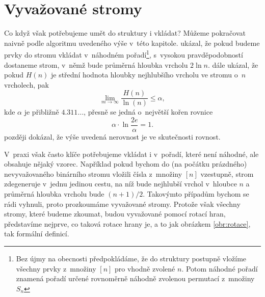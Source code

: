 \section{Vyvažované stromy}

Co když však potřebujeme umět do struktury i vkládat? Můžeme pokračovat naivně
podle algoritmu uvedeného výše v~této kapitole. \citet{sortingsearching}
ukázal, že pokud budeme prvky do stromu vkládat v~náhodném pořadí\footnote{Bez
újmy na obecnosti předpokládáme, že do struktury postupně vložíme všechny prvky
z~množiny $[n]$ pro vhodně zvolené $n$. Potom náhodné pořadí znamená pořadí
určené rovnoměrně náhodně zvolenou permutací z~množiny $S_n$}, s~vysokou
pravděpodobností dostaneme strom, v~němž bude průměrná hloubka vrcholu $2 \ln n$.
\citet{Robson} dále ukázal, že pokud $H(n)$ je střední hodnota hloubky nejhlubšího 
vrcholu ve stromu o~$n$ vrcholech, pak $$\lim_{m\rightarrow
\infty}\frac{H(n)}{\ln(n)}\leq\alpha,$$ kde $\alpha$ je přibližně
$4.311\dots$, přesně se jedná o~největší kořen rovnice $$\alpha\cdot \ln
\frac{2e}{\alpha} = 1.$$ \citet{devroye} později dokázal, že výše uvedená
nerovnost je ve skutečnosti rovnost.

V~praxi však často klíče potřebujeme vkládat i v~pořadí, které není náhodné,
ale obsahuje nějaký vzorec. Například pokud bychom do (na počátku prázdného)
nevyvažovaného binárního stromu vložili čísla z~množiny $[n]$ vzestupně, strom
zdegeneruje v~jednu jedinou cestu, na níž bude nejhlubší vrchol v~hloubce $n$ a
průměrná hloubka vrcholu bude $(n+1)/2$. Takovýmto případům bychom se rádi
vyhnuli, proto prozkoumáme vyvažované stromy. Protože však všechny stromy,
které budeme zkoumat, budou vyvažované pomocí rotací hran, představíme nejprve,
co taková rotace hrany je, a to jak obrázkem \ref{obr:rotace}, tak formální definicí.


